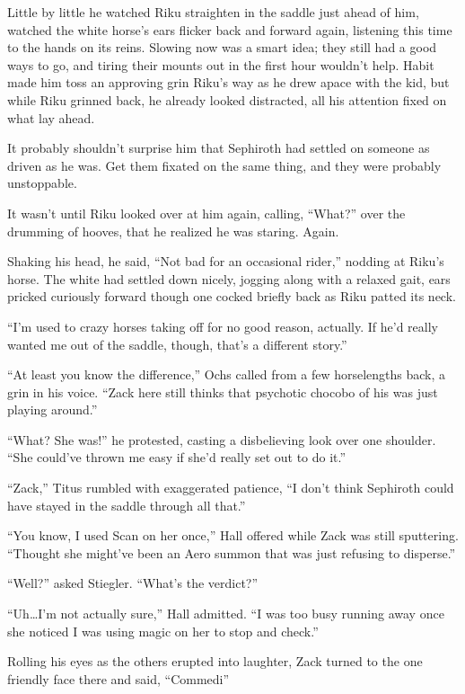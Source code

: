 Little by little he watched Riku straighten in the saddle just ahead of him, watched the white horse's ears flicker back and forward again, listening this time to the hands on its reins. Slowing now was a smart idea; they still had a good ways to go, and tiring their mounts out in the first hour wouldn't help. Habit made him toss an approving grin Riku's way as he drew apace with the kid, but while Riku grinned back, he already looked distracted, all his attention fixed on what lay ahead.

It probably shouldn't surprise him that Sephiroth had settled on someone as driven as he was. Get them fixated on the same thing, and they were probably unstoppable.

It wasn't until Riku looked over at him again, calling, ``What?'' over the drumming of hooves, that he realized he was staring. Again.

Shaking his head, he said, ``Not bad for an occasional rider,'' nodding at Riku's horse. The white had settled down nicely, jogging along with a relaxed gait, ears pricked curiously forward though one cocked briefly back as Riku patted its neck.

``I'm used to crazy horses taking off for no good reason, actually. If he'd really wanted me out of the saddle, though, that's a different story.''

``At least you know the difference,'' Ochs called from a few horselengths back, a grin in his voice. ``Zack here still thinks that psychotic chocobo of his was just playing around.''

``What? She was!'' he protested, casting a disbelieving look over one shoulder. ``She could've thrown me easy if she'd really set out to do it.''

``Zack,'' Titus rumbled with exaggerated patience, ``I don't think Sephiroth could have stayed in the saddle through all that.''

``You know, I used Scan on her once,'' Hall offered while Zack was still sputtering. ``Thought she might've been an Aero summon that was just refusing to disperse.''

``Well?'' asked Stiegler. ``What's the verdict?''

``Uh\ldots I'm not actually sure,'' Hall admitted. ``I was too busy running away once she noticed I was using magic on her to stop and check.''

Rolling his eyes as the others erupted into laughter, Zack turned to the one friendly face there and said, ``Commedi\textemdash ''

